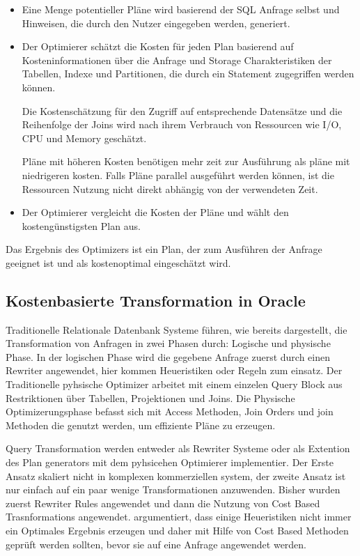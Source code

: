 \begin{itemize}
\item Eine Menge potentieller Pläne wird basierend der SQL Anfrage selbst und Hinweisen, die durch den Nutzer eingegeben werden, generiert.
\item Der Optimierer schätzt die Kosten für jeden Plan basierend auf Kosteninformationen über die Anfrage und Storage Charakteristiken der Tabellen, Indexe und Partitionen, die durch ein Statement zugegriffen werden können.

Die Kostenschätzung für den Zugriff auf entsprechende Datensätze und die Reihenfolge der Joins wird nach ihrem Verbrauch von Ressourcen wie I/O, CPU und Memory geschätzt.

Pläne mit höheren Kosten benötigen mehr zeit zur Ausführung als pläne mit niedrigeren kosten. Falls Pläne parallel ausgeführt werden können, ist die Ressourcen Nutzung nicht direkt abhängig von der verwendeten Zeit.

\item Der Optimierer vergleicht die Kosten der Pläne und wählt den kostengünstigsten Plan aus.
\end{itemize}

Das Ergebnis des Optimizers ist ein Plan, der zum Ausführen der Anfrage geeignet ist und als kostenoptimal eingeschätzt wird.


\subsection{Kostenbasierte Transformation in Oracle}

Traditionelle Relationale Datenbank Systeme führen, wie bereits dargestellt, die Transformation von Anfragen in zwei Phasen durch: Logische und physische Phase. In der logischen Phase wird die gegebene Anfrage zuerst durch einen Rewriter angewendet, hier kommen Heueristiken oder Regeln zum einsatz. Der Traditionelle pyhsische Optimizer arbeitet mit einem einzelen Query Block aus Restriktionen über Tabellen, Projektionen und Joins. Die Physische Optimizerungsphase befasst sich mit Access Methoden, Join Orders und join Methoden die genutzt werden, um effiziente Pläne zu erzeugen.

Query Transformation werden entweder als Rewriter Systeme oder als Extention des Plan generators mit dem pyhsicehen Optimierer implementier. Der Erste Ansatz skaliert nicht in komplexen kommerziellen system, der zweite Ansatz ist nur einfach auf ein paar wenige Transformationen anzuwenden. 
Bisher wurden zuerst Rewriter Rules angewendet und dann die Nutzung von Cost Based Trasnformations angewendet. \cite{ahmed2006cost} argumentiert, dass einige Heueristiken nicht immer ein Optimales Ergebnis erzeugen und daher mit Hilfe von Cost Based Methoden geprüft werden sollten, bevor sie auf eine Anfrage angewendet werden.


